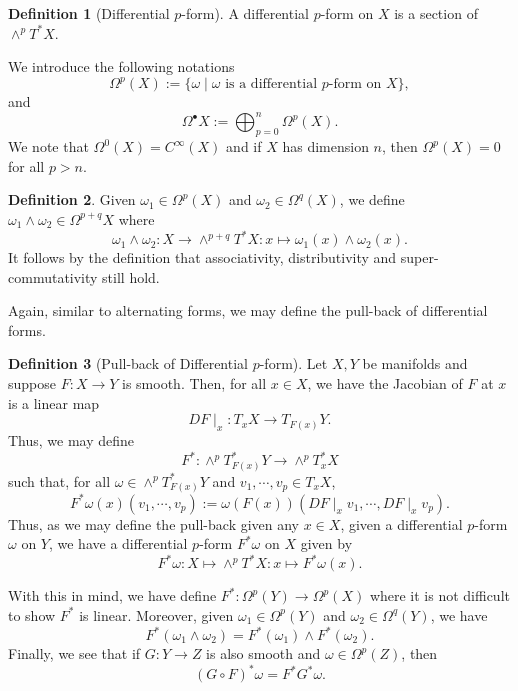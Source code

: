\documentclass[]{article}
\theoremstyle{definition}
\theoremstyle{definition}
\newtheorem{definition}{Definition}[section]
\begin{document}
\begin{definition}[Differential \(p\)-form]
  A differential \(p\)-form on \(X\) is a section of \(\wedge^p T^* X\).
\end{definition}

We introduce the following notations 
\[\Omega^p(X) := \{\omega \mid \omega \text{ is a differential \(p\)-form on \(X\)}\},\]
and 
\[\Omega^\bullet X := \bigoplus_{p = 0}^n \Omega^p(X).\]
We note that \(\Omega^0(X) = C^\infty(X)\) and if \(X\) has dimension \(n\), 
then \(\Omega^p(X) = 0\) for all \(p > n\).

\begin{definition}
  Given \(\omega_1 \in \Omega^p(X)\) and \(\omega_2 \in \Omega^q(X)\), we 
  define \(\omega_1 \wedge \omega_2 \in \Omega^{p + q}X\) where 
  \[\omega_1 \wedge \omega_2 : X \to \wedge^{p + q} T^* X : x \mapsto 
    \omega_1(x) \wedge \omega_2(x).\]
  It follows by the definition that associativity, distributivity and 
  super-commutativity still hold.
\end{definition}

Again, similar to alternating forms, we may define the pull-back of 
differential forms.

\begin{definition}[Pull-back of Differential \(p\)-form]
  Let \(X, Y\) be manifolds and suppose \(F : X \to Y\) is smooth. Then, for 
  all \(x \in X\), we have the Jacobian of \(F\) at \(x\) is a linear map 
  \[DF\mid_x : T_x X \to T_{F(x)} Y.\]
  Thus, we may define 
  \[F^* : \wedge^p T^*_{F(x)} Y \to \wedge^p T^*_x X\]
  such that, for all \(\omega \in \wedge^p T^*_{F(x)}Y\) and 
  \(v_1, \cdots, v_p \in T_x X\),
  \[F^* \omega(x)(v_1, \cdots, v_p) := 
    \omega(F(x))(DF\mid_x v_1, \cdots, DF\mid_x v_p).\]
  Thus, as we may define the pull-back given any \(x \in X\), given a differential 
  \(p\)-form \(\omega\) on \(Y\), we have a differential \(p\)-form \(F^* \omega\) 
  on \(X\) given by 
  \[F^* \omega : X \mapsto \wedge^p T^* X : x \mapsto 
    F^*\omega(x).\]
  \end{definition}
  
With this in mind, we have define \(F^* : \Omega^p(Y) \to \Omega^p(X)\) 
where it is not difficult to show \(F^*\) is linear. Moreover, 
given \(\omega_1 \in \Omega^p(Y)\) and \(\omega_2 \in \Omega^q(Y)\), we 
have 
\[F^*(\omega_1 \wedge \omega_2) = F^*(\omega_1) \wedge F^*(\omega_2).\]
Finally, we see that if \(G : Y \to Z\) is also smooth and \(\omega \in \Omega^p(Z)\), 
then 
\[(G \circ F)^*\omega = F^* G^* \omega.\]
  
\end{document}
